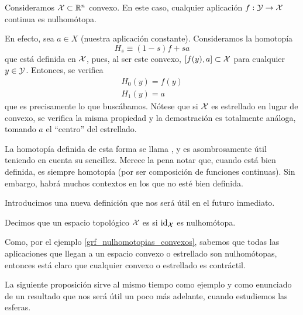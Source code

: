\begin{exa}
	\label{grf_nulhomotopias_convexos}
	Consideramos $\mathcal{X}\subset\mathbb{R}^n$ convexo. En este caso, cualquier aplicación $f:\mathcal{Y}\to\mathcal{X}$ continua es nulhomótopa.
	
	En efecto, sea $a\in X$ (nuestra aplicación constante). Consideramos la homotopía
	\[H_s\equiv(1-s)f+sa\]
	que está definida en $\mathcal{X}$, pues, al ser este convexo, $[f(y),a]\subset\mathcal{X}$ para cualquier $y\in \mathcal{Y}$. Entonces, se verifica
	\[\begin{array}{l}
	H_0(y)=f(y) \\
	H_1(y)=a
	\end{array}\]
	que es precisamente lo que buscábamos. Nótese que si $\mathcal{X}$ es estrellado en lugar de convexo, se verifica la misma propiedad y la demostración es totalmente análoga, tomando $a$ el ``centro'' del estrellado.
	
	La homotopía definida de esta forma se llama , y es asombrosamente útil teniendo en cuenta su sencillez. Merece la pena notar que, cuando está bien definida, es siempre homotopía (por ser composición de funciones continuas). Sin embargo, habrá muchos contextos en los que no esté bien definida.
\end{exa}
Introducimos una nueva definición que nos será útil en el futuro inmediato.
\begin{defi}[Contráctil]
	Decimos que un espacio topológico $\mathcal{X}$ es  si $\operatorname{\mathrm{id}}_{\mathcal{X}}$ es nulhomótopa.
\end{defi}

\begin{obs}
	Como, por el ejemplo \ref{grf_nulhomotopias_convexos}, sabemos que todas las aplicaciones que llegan a un espacio convexo o estrellado son nulhomótopas, entonces está claro que cualquier convexo o estrellado es contráctil.
\end{obs}

La siguiente proposición sirve al mismo tiempo como ejemplo y como enunciado de un resultado que nos será útil un poco más adelante, cuando estudiemos las esferas.

